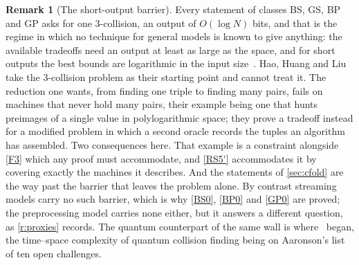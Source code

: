 \documentclass[11pt]{article}
\theoremstyle{plain}
\theoremstyle{definition}
\newtheorem{remark}{Remark}
\newcommand{\cls}[1]{\textsf{#1}}   %
\begin{document}
\begin{remark}[The short-output barrier]\label{r:barrier}
Every statement of classes \cls{BS}, \cls{GS}, \cls{BP} and \cls{GP} asks
for one $3$-collision, an output of $O(\log N)$ bits, and that is the
regime in which no technique for general models is known to give anything:
the available tradeoffs need an output at least as large as the space, and
for short outputs the best bounds are logarithmic in the input
size~\cite{HHL26}.  Hao, Huang and Liu take the $3$-collision problem as
their starting point and cannot treat it.  The reduction one wants, from
finding one triple to finding many pairs, fails on machines that never hold
many pairs, their example being one that hunts preimages of a single value
in polylogarithmic space; they prove a tradeoff instead for a modified
problem in which a second oracle records the tuples an algorithm has
assembled.  Two consequences here.  That example is a constraint alongside
\ref{F3} which any proof must accommodate, and \cref{RS5'} accommodates it
by covering exactly the machines it describes.  And the statements of
\cref{sec:cfold} are the way past the barrier that leaves the problem
alone.  By contrast streaming models carry no such barrier, which is why
\ref{BS0}, \ref{BP0} and \ref{GP0} are proved; the preprocessing model
carries none either, but it answers a different question, as
\cref{r:proxies} records.  The quantum counterpart of the same wall is
where~\cite{HHL26} began, the time--space complexity of quantum collision
finding being on Aaronson's list of ten open challenges.
\end{remark}
\end{document}
